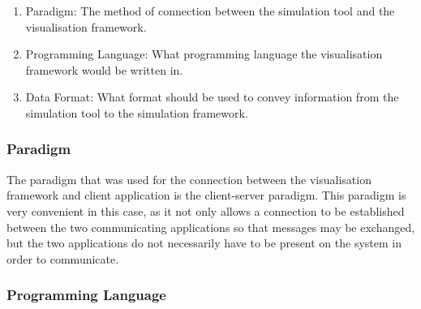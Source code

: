 \documentclass[11pt,a4paper]{article}
\begin{document}
\begin{enumerate}
	\item Paradigm: The method of connection between the simulation tool and the visualisation framework.
	\item Programming Language: What programming language the visualisation framework would be written in.
	\item Data Format: What format should be used to convey information from the simulation tool to the simulation framework.
\end{enumerate}

\subsubsection{Paradigm}

The paradigm that was used for the connection between the visualisation framework and client application is the client-server paradigm. This paradigm is very convenient in this case, as it not only allows a connection to be established between the two communicating applications so that messages may be exchanged, but the two applications do not necessarily have to be present on the system in order to communicate.

\subsubsection{Programming Language}
\end{document}
